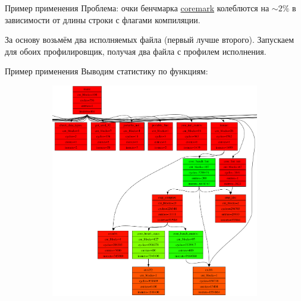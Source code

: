 \documentclass[10pt,aspectratio=169,hyperref={pdftex,unicode},xcolor=dvipsnames]{beamer}
\begin{document}
\begin{frame}{ Пример применения }
    Проблема: очки бенчмарка \href{https://github.com/eembc/coremark}{coremark}
    колеблются на $\sim2\%$ в зависимости от длины строки с флагами компиляции.

    За основу возьмём два исполняемых файла (первый лучше второго).
    Запускаем для обоих профилировщик, получая два файла с профилем исполнения.
\end{frame}

\begin{frame}{ Пример применения }
    Выводим статистику по функциям:
    \begin{figure}
        \begin{subfigure}{0.45\textwidth}
            \centering
            \includegraphics[height=0.8\textheight,keepaspectratio]{./images/stacd_functions.png}
        \end{subfigure}
        \begin{subfigure}{0.45\textwidth}
            \centering
\end{subfigure}
\end{figure}
\end{frame}
\end{document}
